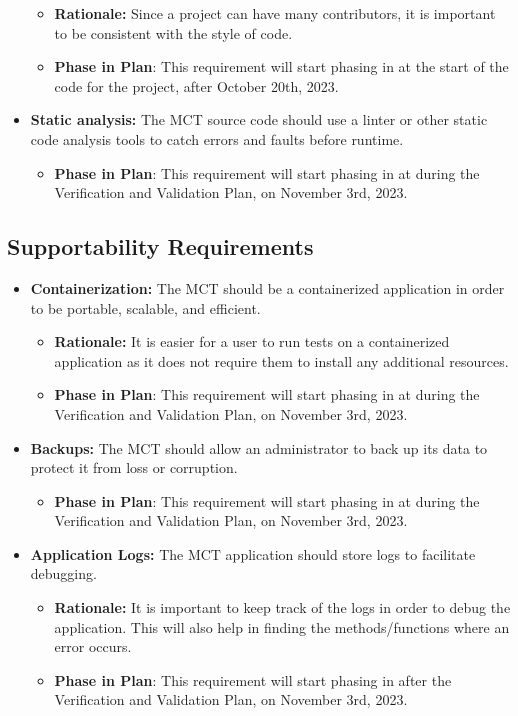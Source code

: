 \documentclass[12pt]{article}
\begin{document}
\begin{itemize}
    \begin{itemize}
        \item \textbf{Rationale: }Since a project can have many contributors, it is important to be consistent with the style of code.
        \item \textbf{Phase in Plan}: This requirement will start phasing in at the start of the code for the project, after October 20th, 2023.
    \end{itemize}
    \item \textbf{Static analysis:} The MCT source code should use a linter or other static code analysis tools to catch errors and faults before runtime.
    \begin{itemize}
        \item \textbf{Phase in Plan}: This requirement will start phasing in at during the Verification and Validation Plan, on November 3rd, 2023.
    \end{itemize}
\end{itemize}


\subsection{Supportability Requirements}

\begin{itemize}
    \item \textbf{Containerization: }The MCT should be a containerized application in order to be portable, scalable, and efficient.
    \begin{itemize}
        \item \textbf{Rationale: }It is easier for a user to run tests on a containerized application as it does not require them to install any additional resources.
        \item \textbf{Phase in Plan}: This requirement will start phasing in at during the Verification and Validation Plan, on November 3rd, 2023.
    \end{itemize}
    \item \textbf{Backups: }The MCT should allow an administrator to back up its data to protect it from loss or corruption.
    \begin{itemize}
        \item \textbf{Phase in Plan}: This requirement will start phasing in at during the Verification and Validation Plan, on November 3rd, 2023.
    \end{itemize}
    \item \textbf{Application Logs:} The MCT application should store logs to facilitate debugging.
    \begin{itemize}
        \item \textbf{Rationale: }It is important to keep track of the logs in order to debug the application. This will also help in finding the methods/functions where an error occurs.
        \item \textbf{Phase in Plan}: This requirement will start phasing in after the Verification and Validation Plan, on November 3rd, 2023.
    \end{itemize}
\end{itemize}
\end{document}
